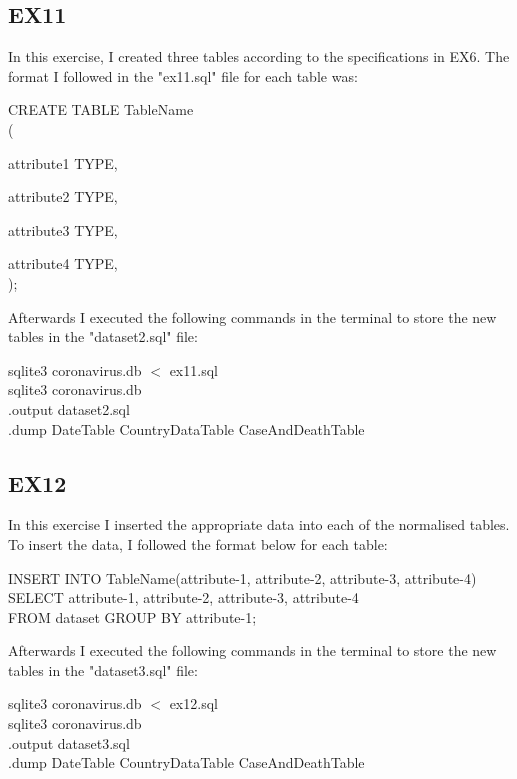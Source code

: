 \documentclass{article}
\begin{document}
\subsection{EX11}
In this exercise, I created three tables according to the specifications in EX6. The format I followed in the "ex11.sql" file for each table was:
\begin{algorithm}
CREATE TABLE TableName \\
( \par
    attribute1 TYPE, \par
    attribute2 TYPE, \par
    attribute3 TYPE, \par
    attribute4 TYPE, \\
);
\end{algorithm} \par
Afterwards I executed the following commands in the terminal to store the new tables in the "dataset2.sql" file:
\begin{algorithm}
sqlite3 coronavirus.db $<$ ex11.sql \\
sqlite3 coronavirus.db \\
.output dataset2.sql \\
.dump DateTable CountryDataTable CaseAndDeathTable
\end{algorithm} \par

\subsection{EX12}
In this exercise I inserted the appropriate data into each of the normalised tables. To insert the data, I followed the format below for each table:
\begin{algorithm}
INSERT INTO TableName(attribute-1, attribute-2, attribute-3, attribute-4) \\
SELECT attribute-1, attribute-2, attribute-3, attribute-4 \\
FROM dataset GROUP BY attribute-1;
\end{algorithm} \par
Afterwards I executed the following commands in the terminal to store the new tables in the "dataset3.sql" file:
\begin{algorithm}
sqlite3 coronavirus.db $<$ ex12.sql \\
sqlite3 coronavirus.db \\
.output dataset3.sql \\
.dump DateTable CountryDataTable CaseAndDeathTable
\end{algorithm} \newpage
\end{document}
